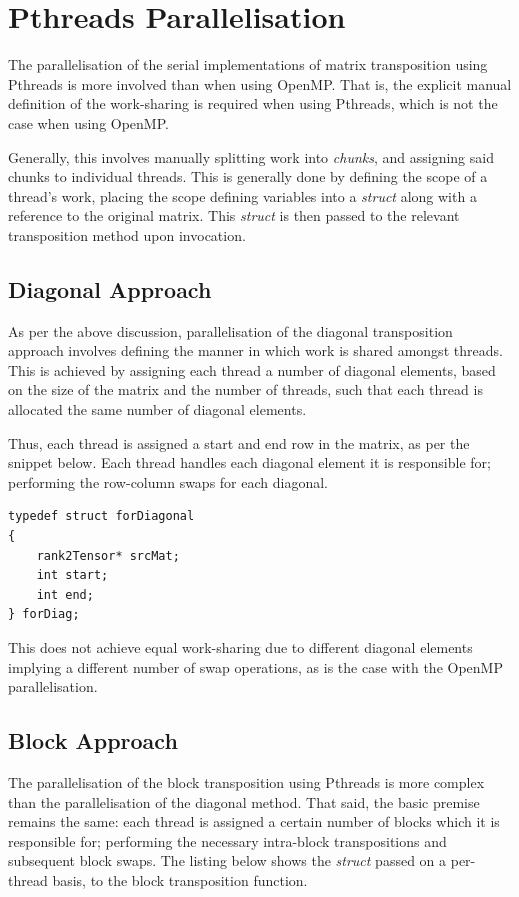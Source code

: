 \documentclass[journal,10pt]{IEEEtran}
\begin{document}
\section{Pthreads Parallelisation}
The parallelisation of the serial implementations of matrix transposition using Pthreads is more involved than when using OpenMP. That is, the explicit manual definition of the work-sharing is required when using Pthreads, which is not the case when using OpenMP.

Generally, this involves manually splitting work into \textit{chunks}, and assigning said chunks to individual threads. This is generally done by defining the scope of a thread's work, placing the scope defining variables into a \textit{struct} along with a reference to the original matrix. This \textit{struct} is then passed to the relevant transposition method upon invocation.%

\subsection{Diagonal Approach}

As per the above discussion, parallelisation of the diagonal transposition approach involves defining the manner in which work is shared amongst threads. This is achieved by assigning each thread a number of diagonal elements, based on the size of the matrix and the number of threads, such that each thread is allocated the same number of diagonal elements.



Thus, each thread is assigned a start and end row in the matrix, as per the snippet below. Each thread handles each diagonal element it is responsible for; performing the row-column swaps for each diagonal.

\begin{lstlisting}
typedef struct forDiagonal
{
    rank2Tensor* srcMat;
	int start;
	int end;
} forDiag;
\end{lstlisting}


This does not achieve equal work-sharing due to different diagonal elements implying a different number of swap operations, as is the case with the OpenMP parallelisation.


\subsection{Block Approach}
The parallelisation of the block transposition using Pthreads is more complex than the parallelisation of the diagonal method. That said, the basic premise remains the same: each thread is assigned a certain number of blocks which it is responsible for; performing the necessary intra-block transpositions and subsequent block swaps. The listing below shows the \textit{struct} passed on a per-thread basis, to the block transposition function.
\end{document}
